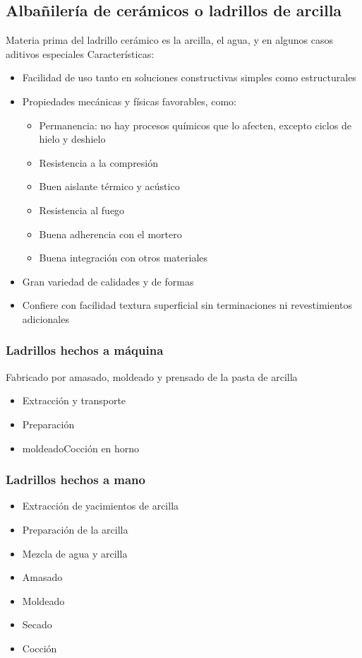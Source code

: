 \subsection{Albañilería de cerámicos o ladrillos de arcilla}
Materia prima del ladrillo cerámico es la arcilla, el agua, y en algunos casos aditivos especiales
Características:
\begin{itemize}
    \item Facilidad de uso tanto en soluciones constructivas simples como estructurales
    \item Propiedades mecánicas y físicas favorables, como:
    \begin{itemize}
        \item Permanencia: no hay procesos químicos que lo afecten, excepto ciclos de hielo y deshielo
        \item Resistencia a la compresión
        \item Buen aislante térmico y acústico
        \item Resistencia al fuego
        \item Buena adherencia con el mortero
        \item Buena integración con otros materiales
    \end{itemize}
    \item Gran variedad de calidades y de formas
    \item Confiere con facilidad textura superficial sin terminaciones ni revestimientos adicionales
\end{itemize}

\subsubsection{Ladrillos hechos a máquina}
Fabricado por amasado, moldeado y prensado de la pasta de arcilla
\begin{itemize}
    \item Extracción y transporte
    \item Preparación
    \item moldeadoCocción en horno
\end{itemize}
\subsubsection{Ladrillos hechos a mano}
\begin{itemize}
    \item Extracción de yacimientos de arcilla
    \item Preparación de la arcilla
    \item Mezcla de agua y arcilla
    \item Amasado
    \item Moldeado
    \item Secado
    \item Cocción
\end{itemize}

